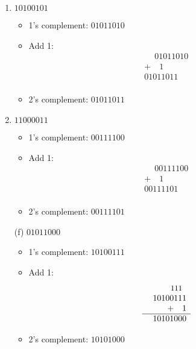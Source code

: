 \documentclass{article}
\begin{document}
\begin{enumerate}
    \item \(10100101\)
        \begin{itemize}
            \item 1’s complement: \(01011010\)
            \item Add 1:
                  \[
                  \begin{array}{r}
                    \phantom{+}01011010 \\
                    +\quad 1 \\
                    \hline
                    01011011 \\
                  \end{array}
                  \]
            \item 2’s complement: \(01011011\)
        \end{itemize}

    \item \(11000011\)
        \begin{itemize}
            \item 1’s complement: \(00111100\)
            \item Add 1:
                  \[
                  \begin{array}{r}
                    \phantom{+}00111100 \\
                    +\quad 1 \\
                    \hline
                    00111101 \\
                  \end{array}
                  \]
            \item 2’s complement: \(00111101\)
        \end{itemize}

    \item[(f)] \(01011000\)
        \begin{itemize}
            \item 1’s complement: \(10100111\)
            \item Add 1:
                  \[
                  \begin{array}{r}

                    \quad \text{\small 111}\phantom{0}\\
                    \phantom{+}10100111 \\
                    +\quad 1 \\
                    \hline
                    10101000 \\
                  \end{array}
                  \]
            \item 2’s complement: \(10101000\)
        \end{itemize}
\end{enumerate}
\end{document}
